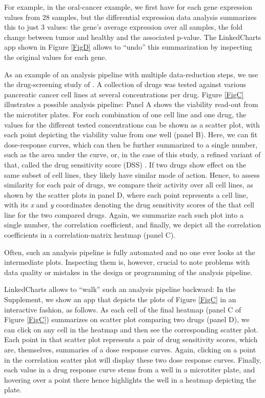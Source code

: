 \documentclass[twocolumn,10pt]{article}
\begin{document}
For example, in the oral-cancer example, we first have for each gene expression values from 28 samples, but the differential expression data analysis summarizes this to just 3 values: the gene's average expression over all samples, the fold change between tumor and healthy and the associated p-value. The LinkedCharts app shown in Figure \ref{FigD} allows to ``undo'' this summarization by inspecting the original values for each gene.

As an example of an analysis pipeline with multiple data-reduction steps, we use the drug-screening study of \citet{he_2018}. A collection of drugs was tested against various pancreatic cancer cell lines at several concentrations per drug. Figure \ref{FigC} illustrates a possible analysis pipeline: Panel A shows the viability read-out from the microtiter plates. For each combination of one cell line and one drug, the values for the different tested concentrations can be shown as a scatter plot, with each point depicting the viability value from one well (panel B). Here, we can fit dose-response curves, which can then be further summarized to a single number, such as the area under the curve, or, in the case of this study, a refined variant of that, called the drug sensitivity score (DSS) \citep{yadav_2014}. If two drugs show effect on the same subset of cell lines, they likely have similar mode of action. Hence, to assess similarity for each pair of drugs, we compare their activity over all cell lines, as shown by the scatter plots in panel D, where each point represents a cell line, with its \emph{x} and \emph{y} coordinates denoting the drug sensitivity scores of the that cell line for the two compared drugs. Again, we summarize each such plot into a single number, the correlation coefficient, and finally, we depict all the correlation coefficients in a correlation-matrix heatmap (panel C).

Often, such an analysis pipeline is fully automated and no one ever looks at the intermediate plots. Inspecting them is, however, crucial to note problems with data quality or mistakes in the design or programming of the analysis pipeline.

LinkedCharts allows to ``walk'' such an analysis pipeline backward: In the Supplement, we show an app that depicts the plots of Figure \ref{FigC} in an interactive fashion, as follows. As each cell of the final heatmap (panel C of Figure \ref{FigC}) summarizes on scatter plot comparing two drugs (panel D), we can click on any cell in the heatmap and then see the corresponding scatter plot. Each point in that scatter plot represents a pair of drug sensitivity scores, which are, themselves, summaries of a dose response curves. Again, clicking on a point in the correlation scatter plot will display these two dose response curves. Finally, each value in a drug response curve stems from a well in a microtiter plate, and hovering over a point there hence highlights the well in a heatmap depicting the plate.
\end{document}
